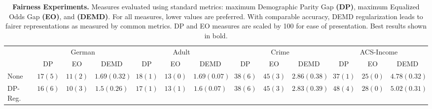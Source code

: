 \begin{table}[!t] 
	\scriptsize
	\setlength\tabcolsep{3.5pt} %
	\caption[Fairness application comparisons using DEMD regularization]{\textbf{Fairness Experiments.} Measures evaluated using standard metrics: maximum Demographic Parity Gap \textbf{(DP)},  maximum Equalized Odds Gap \textbf{(EO)}, and \textbf{(DEMD)}. For all measures, lower values are preferred.  With comparable accuracy, DEMD regularization leads to fairer representations as measured by common metrics. DP and EO measures are scaled by 100 for ease of presentation. Best results shown in bold.}
	\begin{tabular*}{\linewidth}{l *{3}{c}|*{3}{c}|*{3}{c}|*{3}{c}}
		\midrule%
		& \multicolumn{3}{c}{German} & \multicolumn{3}{c}{Adult} & \multicolumn{3}{c}{Crime}& \multicolumn{3}{c}{ACS-Income} \\
		\cmidrule{2-4} \cmidrule{5-7} \cmidrule{8-10} \cmidrule{11-13}
		& DP & EO & DEMD & DP & EO & DEMD & DP & EO & DEMD & DP & EO & DEMD \\ 
		\midrule
None & $17\scriptscriptstyle(5)$ & $11\scriptscriptstyle(2)$ & $1.69\scriptscriptstyle(0.32)$ & $18\scriptscriptstyle(1)$ & $13\scriptscriptstyle(0)$ & $1.69\scriptscriptstyle(0.07)$ & $38\scriptscriptstyle(6)$ & $45\scriptscriptstyle(3)$ & $2.86\scriptscriptstyle(0.38)$ & $37\scriptscriptstyle(1)$ & $25\scriptscriptstyle(0)$ & $4.78\scriptscriptstyle(0.32)$ \\
DP-Reg. & $16\scriptscriptstyle(6)$ & $10\scriptscriptstyle(3)$ & $1.5\scriptscriptstyle(0.26)$ & $17\scriptscriptstyle(1)$ & $13\scriptscriptstyle(1)$ & $1.6\scriptscriptstyle(0.07)$ & $38\scriptscriptstyle(6)$ & $45\scriptscriptstyle(3)$ & $2.83\scriptscriptstyle(0.39)$ & $48\scriptscriptstyle(4)$ & $28\scriptscriptstyle(0)$ & $5.02\scriptscriptstyle(0.31)$ \\

\end{tabular*}
\end{table}
